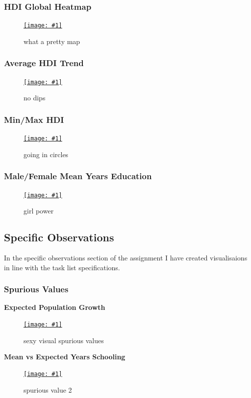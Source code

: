 \documentclass[11pt,a4paper,final]{article}
\newcommand\onlinefig[3]{
\begin{figure}[H]
  \centering
  \href{#3}{\texttt{[image: \#1]}}
  \caption{#2} 
  \label{fig:#1}
\end{figure}
}
\begin{document}
\begin{multicols}{2}
\subsubsection{HDI Global Heatmap}
\onlinefig{hdi_global_heatmap}{what a pretty map}{https://public.tableau.com/views/CS3205-HDI/Sheet3?:language=en-GB&:display_count=n&:origin=viz_share_link}

\subsubsection{Average HDI Trend}
\onlinefig{global_average_hdi_areachart}{no dips}{https://public.tableau.com/views/CS3205_hdi_csv/Sheet2?:language=en-GB&:display_count=n&:origin=viz_share_link}

\subsubsection{Min/Max HDI}
\onlinefig{min_vs_max_hdi_radialplot}{going in circles}{https://user-images.githubusercontent.com/56483187/155840052-f17e03e9-c48b-4dfd-8096-2bd5f066dd91.png}

\subsubsection{Male/Female Mean Years Education}
\onlinefig{men_vs_women_mean_years_education_barchart}{girl power}{https://public.tableau.com/views/CS3205-HDI/Sheet2?:language=en-GB&:display_count=n&:origin=viz_share_link}


\subsection{Specific Observations}
In the specific observations section of the assignment I have created visualisaions in line with the task list specifications.

\subsubsection{Spurious Values}
\textbf{Expected Population Growth}
\onlinefig{population_growth_ratio_boxplot}{sexy visual spurious values}{https://public.tableau.com/views/CS3205-HDI/Sheet11?:language=en-GB&:display_count=n&:origin=viz_share_link}

\begin{flushleft}
\textbf{Mean vs Expected Years Schooling}
\end{flushleft}
\vspace{-2cm}
\onlinefig{mean_vs_expected_years_schooling_scatterplot.png}{spurious value 2}{https://public.tableau.com/views/CS3205-HDI/Sheet7?:language=en-GB&:display_count=n&:origin=viz_share_link}


\end{multicols}
\end{document}
